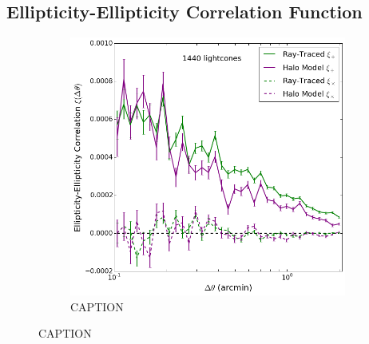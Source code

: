 \documentclass[%
 reprint,
 amsmath,amssymb,
 aps,nofootinbib
]{revtex4-1}
\begin{document}
\subsection{Ellipticity-Ellipticity Correlation Function}

\begin{figure}
    \centering
    \begin{subfigure}{0.475\textwidth}
        \includegraphics[width=\textwidth]{figs-swe/thesis/gg_corr.png}
        \captionsetup{justification=raggedright,singlelinecheck=false}
        \caption{CAPTION}

\end{subfigure}
\end{figure}
\end{document}
